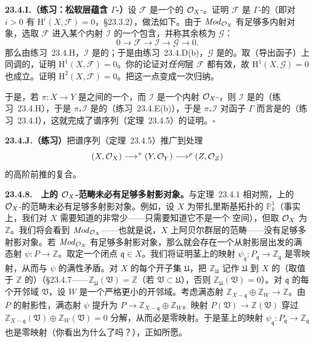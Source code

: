\textbf{23.4.I.（练习：松软层蕴含 $\Gamma$-\trAcyclic）}\quad 设 $\mathscr{F}$ 是一个\trFlasque{}的 $\mathcal{O}_X$-\trModule。证明 $\mathscr{F}$ 是 $\Gamma$-\trAcyclic{}的（即对 $i>0$ 有 $\mathrm{H}^i(X,\mathscr{F})=0$，\S23.3.2），做法如下。由于 $\mathit{Mod}_{\mathcal{O}_X}$ 有足够多内射对象，选取 $\mathscr{F}$ 进入某个内射 $\mathscr{I}$ 的一个包含，并称其余核为 $\mathscr{G}$：
\[
0 \longrightarrow \mathscr{F} \longrightarrow \mathscr{I} \longrightarrow \mathscr{G} \longrightarrow 0.
\]
那么由\mbox{练习~23.4.H}，$\mathscr{I}$ 是\trFlasque{}的；于是由\mbox{练习~23.4.D}(b)，$\mathscr{G}$ 是\trFlasque{}的。取（导出函子）上同调的\trLongExactSequence，证明 $\mathrm{H}^1(X,\mathscr{F})=0$。你的论证对\emph{任何}\trFlasque{}层 $\mathscr{F}$ 都有效，故 $\mathrm{H}^1(X,\mathscr{G})=0$ 也成立。证明 $\mathrm{H}^2(X,\mathscr{F})=0$。把这一点变成一次归纳。

于是，若 $\pi\colon X\to Y$ 是\trRingedSpace{}之间的一个\trMorphism，而 $\mathscr{I}$ 是一个内射 $\mathcal{O}_X$-\trModule，则 $\mathscr{I}$ 是\trFlasque{}的（\mbox{练习~23.4.H}），于是 $\pi_\ast\mathscr{I}$ 是\trFlasque{}的（\mbox{练习~23.4.E}(b)），于是 $\pi_\ast\mathscr{I}$ 对函子 $\Gamma$ 而言是\trAcyclic{}的（\mbox{练习~23.4.I}），这就完成了\trLeray{}谱序列（\mbox{定理~23.4.5}）的证明。\hfill$\square$

\textbf{23.4.J.（练习）}\quad 把\trLeray{}谱序列（\mbox{定理~23.4.5}）推广到处理
\[
(X,\mathcal{O}_X) \longrightarrow^{\pi} (Y,\mathcal{O}_Y) \longrightarrow^{\rho} (Z,\mathcal{O}_Z)
\]
的高阶前推的复合。

\textbf{23.4.8.}\ \extrahard\ \textbf{\trRingedSpace{}上的 $\mathcal{O}_X$-\trModule{}范畴未必有足够多射影对象。}\quad 与\mbox{定理~23.4.1} 相对照，\trRingedSpace{}上的 $\mathcal{O}_X$-\trModule{}的范畴未必有足够多射影对象。例如，设 $X$ 为带扎里斯基拓扑的 $\mathbb{P}^1_k$（事实上，我们对 $X$ 需要知道的非常少——只需要知道它不是一个 \trAlexandrov{}空间），但取 $\mathcal{O}_X$ 为\trConstantSheaf{} $\mathbb{Z}$。我们将会看到 $\mathit{Mod}_{\mathcal{O}_X}$——也就是说，$X$ 上阿贝尔群层的范畴——没有足够多射影对象。若 $\mathit{Mod}_{\mathcal{O}_X}$ 有足够多射影对象，那么就会存在一个从射影层出发的满态射 $\psi\colon P\to\mathbb{Z}$。取定一个闭点 $\mathfrak{q}\in X$。我们将证明茎上的映射 $\psi_\mathfrak{q}\colon P_\mathfrak{q}\to\mathbb{Z}_\mathfrak{q}$ 是零映射，从而与 $\psi$ 的满性矛盾。对 $X$ 的每个开子集 $\mathfrak{U}$，把 $\mathbb{Z}_\mathfrak{U}$ 记作 $\mathfrak{U}$ 到 $X$ 的\trExtensionByZero{}（取值于 $\mathbb{Z}$ 的\trConstantSheaf）（\S23.4.7——$\mathbb{Z}_\mathfrak{U}(\mathfrak{V})=\mathbb{Z}$（若 $\mathfrak{V}\subset\mathfrak{U}$），否则 $\mathbb{Z}_\mathfrak{U}(\mathfrak{V})=0$）。对 $\mathfrak{q}$ 的每个开邻域 $\mathfrak{V}$，设 $W$ 是一个严格更小的开邻域。考虑满态射 $\mathbb{Z}_{X-\mathfrak{q}}\oplus\mathbb{Z}_W\to\mathbb{Z}$。由 $P$ 的射影性，满态射 $\psi$ 提升为 $P\to\mathbb{Z}_{X-\mathfrak{q}}\oplus\mathbb{Z}_W$。映射 $P(\mathfrak{V})\to\mathbb{Z}(\mathfrak{V})$ 穿过 $\mathbb{Z}_{X-\mathfrak{q}}(\mathfrak{V})\oplus\mathbb{Z}_W(\mathfrak{V})=0$ 分解，从而必是零映射。于是茎上的映射 $\psi_\mathfrak{q}\colon P_\mathfrak{q}\to\mathbb{Z}_\mathfrak{q}$ 也是零映射（你看出为什么了吗？），正如所愿。

